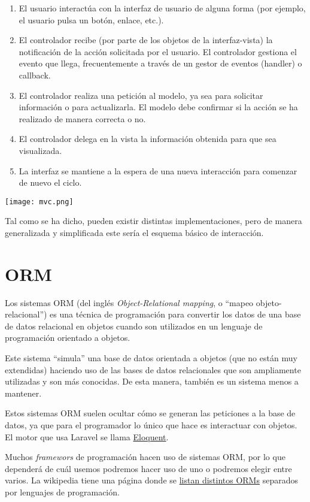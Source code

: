 {
\begin{minipage}{0.56\linewidth}
\begin{enumerate}
    \item El usuario interactúa con la interfaz de usuario de alguna forma (por ejemplo, el usuario pulsa un botón, enlace, etc.).

    \item El controlador recibe (por parte de los objetos de la interfaz-vista) la notificación de la acción solicitada por el usuario. El controlador gestiona el evento que llega, frecuentemente a través de un gestor de eventos (handler) o callback.

    \item El controlador realiza una petición al modelo, ya sea para solicitar información o para actualizarla. El modelo debe confirmar si la acción se ha realizado de manera correcta o no.

    \item El controlador delega en la vista la información obtenida para que sea visualizada.

    \item La interfaz se mantiene a la espera de una nueva interacción para comenzar de nuevo el ciclo.
\end{enumerate}
\end{minipage}
\hfill
\begin{minipage}{0.4\linewidth}
    \texttt{[image: mvc.png]}
\end{minipage}
}

\vspace{10pt}
Tal como se ha dicho, pueden existir distintas implementaciones, pero de manera generalizada y simplificada este sería el esquema básico de interacción.


\chapter{ORM}
Los sistemas ORM (del inglés \textit{Object-Relational mapping}, o “mapeo objeto-relacional”) es una técnica de programación para convertir los datos de una base de datos relacional en objetos cuando son utilizados en un lenguaje de programación orientado a objetos.

Este sistema “simula” una base de datos orientada a objetos (que no están muy extendidas) haciendo uso de las bases de datos relacionales que son ampliamente utilizadas y son más conocidas. De esta manera, también es un sistema menos a mantener.

Estos sistemas ORM suelen ocultar cómo se generan las peticiones a la base de datos, ya que para el programador lo único que hace es interactuar con objetos. El motor que usa Laravel se llama \href{https://laravel.com/docs/10.x/eloquent#retrieving-models}{Eloquent}.

Muchos \textit{framewors} de programación hacen uso de sistemas ORM, por lo que dependerá de cuál usemos podremos hacer uso de uno o podremos elegir entre varios. La wikipedia tiene una página donde se \href{https://en.wikipedia.org/wiki/List_of_object%E2%80%93relational_mapping_software}{listan distintos ORMs} separados por lenguajes de programación.